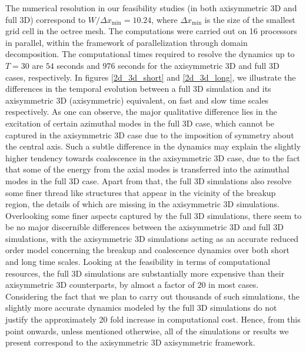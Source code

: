 The numerical resolution in our feasibility studies (in both axisymmetric 3D and full 3D) correspond to 
$W / \Delta x_{\textrm{min}} = 10.24$, where $\Delta x_{\textrm{min}}$ is the size 
of the smallest grid cell in the octree mesh. 
The computations were carried out on 16 processors in parallel, within the framework
of parallelization through domain decomposition.
The computational times required to resolve the dynamics up to $T = 30$ are $54$ seconds 
and $976$ seconds for the axisymmetric 3D and full 3D cases, respectively. 
In figures \ref{2d_3d_short} and \ref{2d_3d_long}, we illustrate the differences 
in the temporal evolution between a full 3D simulation and its axisymmetric 3D (axisymmetric)
equivalent, on fast and slow time scales respectively. 
As one can observe, the major qualitative difference 
lies in the excitation of certain azimuthal modes in the full 3D case, 
which cannot be captured in the axisymmetric 3D case due to the 
imposition of symmetry about the central axis.
Such a subtle difference in the dynamics may 
explain the slightly higher tendency towards coalescence 
in the axisymmetric 3D case, due to the fact that some of the energy from 
the axial modes is transferred into the azimuthal modes in the full 3D case. 
Apart from that, the full 3D simulations also resolve some 
finer thread like structures that appear in the vicinity 
of the breakup region, the details of which are missing in the axisymmetric 3D simulations.  
Overlooking some finer aspects captured by the full 3D simulations,  
there seem to be no major discernible differences between the axisymmetric 3D and full 3D simulations,
with the axisymmetric 3D simulations acting as an accurate reduced order model concerning the 
breakup and coalescence dynamics over both short and long time scales.
Looking at the feasibility in terms of computational resources, the full 3D simulations 
are substantially more expensive than their axisymmetric 3D counterparts, by almost a factor of $20$ in most cases. 
Considering the fact that we plan to carry out thousands of such simulations, the 
slightly more accurate dynamics modeled by the full 3D simulations do not justify the
approximately 20 fold increase in computational cost.   
Hence, from this point onwards, unless mentioned otherwise, all of the 
simulations or results we present correspond to the axisymmetric 3D axisymmetric framework.




